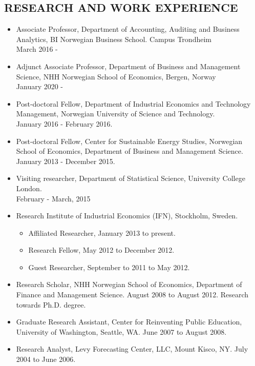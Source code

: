 \documentclass[margin]{res}
\begin{document}
\begin{resume}
\section{RESEARCH AND WORK EXPERIENCE}
                  \begin{itemize}
                  \setlength{\itemsep}{10pt}
                  \item[] Associate Professor, Department of Accounting, Auditing and Business Analytics, BI Norwegian Business School. Campus Trondheim \\ March 2016 -
                  \item[] Adjunct Associate Professor, Department of Business and Management Science, NHH Norwegian School of Economics, Bergen, Norway \\ January 2020 -
                  \item[] Post-doctoral Fellow, Department of Industrial Economics and Technology Management, Norwegian University of Science and Technology. \\ January 2016 - February 2016.
                  \item[] Post-doctoral Fellow, Center for Sustainable Energy Studies, Norwegian School of Economics, Department of Business and Management Science. \\ January 2013 - December 2015.
                  \item[] Visiting researcher, Department of Statistical Science, University College London. \\ February - March, 2015
                  \item[] Research Institute of Industrial Economics (IFN), Stockholm, Sweden.
                    \begin{itemize}
                    \item[] Affiliated Researcher, January 2013 to present.
                    \item[] Research Fellow, May 2012 to December 2012.
                    \item[] Guest Researcher, September to 2011 to May 2012.
                    \end{itemize}
                  \item[] Research Scholar, NHH Norwegian School of Economics, Department of Finance and Management Science. August 2008 to August 2012.
                  Research towards Ph.D. degree.
                  \item[] Graduate Research Assistant, Center for Reinventing Public Education, University of Washington, Seattle, WA. June 2007 to August 2008.
                  \item[] Research Analyst, Levy Forecasting Center, LLC, Mount Kisco, NY. July 2004 to June 2006.
                  \end{itemize}


\end{resume}
\end{document}
